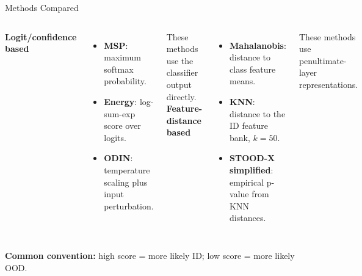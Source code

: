 \documentclass[10pt,aspectratio=169]{beamer}
\begin{document}
\begin{frame}{Methods Compared}
  \begin{columns}[T,onlytextwidth]
      \textbf{Logit/confidence based}
      \begin{itemize}
        \item \textbf{MSP}: maximum softmax probability.
        \item \textbf{Energy}: log-sum-exp score over logits.
        \item \textbf{ODIN}: temperature scaling plus input perturbation.
      \end{itemize}

      \vspace{0.8em}
      These methods use the classifier output directly.
      \textbf{Feature-distance based}
      \begin{itemize}
        \item \textbf{Mahalanobis}: distance to class feature means.
        \item \textbf{KNN}: distance to the ID feature bank, $k=50$.
        \item \textbf{STOOD-X simplified}: empirical p-value from KNN distances.
      \end{itemize}

      \vspace{0.8em}
      These methods use penultimate-layer representations.
  \end{columns}

  \vspace{0.7em}
  \centering
  \textbf{Common convention:} high score = more likely ID; low score = more likely OOD.
\end{frame}
\end{document}
